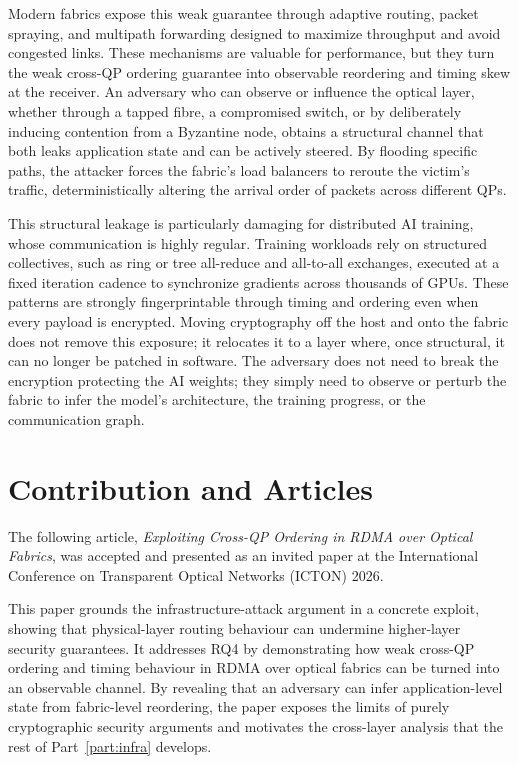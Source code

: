 Modern fabrics expose this weak guarantee through adaptive routing, packet spraying, and multipath forwarding designed to maximize throughput and avoid congested links. These mechanisms are valuable for performance, but they turn the weak cross-QP ordering guarantee into observable reordering and timing skew at the receiver. An adversary who can observe or influence the optical layer, whether through a tapped fibre, a compromised switch, or by deliberately inducing contention from a Byzantine node, obtains a structural channel that both leaks application state and can be actively steered. By flooding specific paths, the attacker forces the fabric's load balancers to reroute the victim's traffic, deterministically altering the arrival order of packets across different QPs.

This structural leakage is particularly damaging for distributed AI training, whose communication is highly regular. Training workloads rely on structured collectives, such as ring or tree all-reduce and all-to-all exchanges, executed at a fixed iteration cadence to synchronize gradients across thousands of GPUs. These patterns are strongly fingerprintable through timing and ordering even when every payload is encrypted. Moving cryptography off the host and onto the fabric does not remove this exposure; it relocates it to a layer where, once structural, it can no longer be patched in software. The adversary does not need to break the encryption protecting the AI weights; they simply need to observe or perturb the fabric to infer the model's architecture, the training progress, or the communication graph.

\section{Contribution and Articles}
\label{sec:rdma-context}

The following article, \textit{Exploiting Cross-QP Ordering in RDMA over Optical Fabrics}, was accepted and presented as an invited paper at the International Conference on Transparent Optical Networks (ICTON) 2026.

This paper grounds the infrastructure-attack argument in a concrete exploit, showing that physical-layer routing behaviour can undermine higher-layer security guarantees. It addresses RQ4 by demonstrating how weak cross-QP ordering and timing behaviour in RDMA over optical fabrics can be turned into an observable channel. By revealing that an adversary can infer application-level state from fabric-level reordering, the paper exposes the limits of purely cryptographic security arguments and motivates the cross-layer analysis that the rest of Part~\ref{part:infra} develops.

